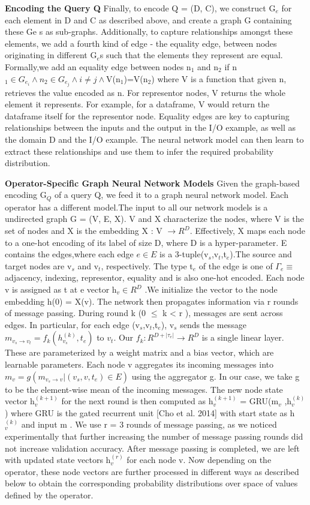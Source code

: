 \documentclass{article}
\begin{document}
\textbf{Encoding the Query Q} Finally, to encode Q = (D, C), we construct G$_e$ for each element in D and C as described above, and create a graph G containing these Ge s as sub-graphs. Additionally, to capture relationships amongst these elements, we add a fourth kind of edge - the equality edge, between nodes originating in different G$_e$s such that the elements they represent are equal. Formally,we add an equality edge between nodes n$_1$ and n$_2$ if n$_1 \in G_{e_i} \wedge n_2 \in G_{e_j} \wedge i\neq j \wedge$V(n$_1$)=V(n$_2$) where V is a function that given n, retrieves the value encoded as n. For representor nodes, V returns the whole element it represents. For example, for a dataframe, V would return the dataframe itself for the representor node. Equality edges are key to capturing relationships between the inputs and the output in the I/O example, as well as the domain D and the I/O example. The neural network model can then learn to extract these relationships and use them to infer the required probability distribution.

\textbf{Operator-Specific Graph Neural Network Models} Given the graph-based encoding G$_Q$ of a query Q, we feed it to a graph neural network model. Each operator has a different model.The input to all our network models is a undirected graph G = (V, E, X). V and X characterize the nodes, where V is the set of nodes and X is the embedding X : V $\rightarrow R^D$. Effectively, X maps each node to a one-hot encoding of its label of size D, where D is a hyper-parameter. E contains the edges,where each edge $e\in E $ is a 3-tuple(v$_s$,v$_t$,t$_e$).The source and target nodes are v$_s$ and v$_t$, respectively. The type t$_e$ of the edge is one of $\Gamma _e \equiv$ {adjacency, indexing, representor, equality} and is also one-hot encoded. Each node v is assigned as t at e vector h$_v \in R^D$ .We initialize the vector to the node embedding h(0) = X(v). The network then propagates information via r rounds of message passing. During round k (0 $\leq$ k < r ), messages are sent across edges. In particular, for each edge (v$_s$,v$_t$,t$_e$), v$_s$ sends the message $m_{v_s \rightarrow v_t} = f_k(h^{(k)}_{v_s},t_e )$ to $v_t$. Our $f_k : R^{D+|\tau_e|} → R^D$ is a single linear layer. These are parameterized by a weight matrix and a bias vector, which are learnable parameters. Each node v aggregates its incoming messages into $m_{v} = g({m_{v_s \rightarrow v}|(v_s,v,t_e) \in E})$ using the aggregator g. In our case, we take g to be the element-wise mean of the incoming messages. The new node state vector h$^{(k+1)}_v$ for the next round is then computed as h$^{(k+1)}_v$ = GRU(m$_v$ ,h$^{(k)}_v$) where GRU is the gated recurrent unit [Cho et al. 2014] with start state as h$^{(k)}_v$ and input m . We use r = 3 rounds of message passing, as we noticed experimentally that further increasing the number of message passing rounds did not increase validation accuracy. After message passing is completed, we are left with updated state vectors h$^{(r)}_v$ for each node v. Now depending on the operator, these node vectors are further processed in different ways as described below to obtain the corresponding probability distributions over space of values defined by the operator.
\end{document}
